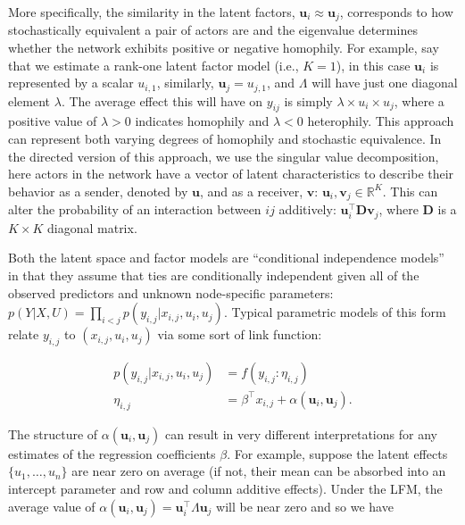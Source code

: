 \documentclass[12pt,pdflatex]{elsarticle}
\begin{document}
More specifically, the similarity in the latent factors, $\textbf{u}_{i} \approx \textbf{u}_{j}$, corresponds to how stochastically equivalent a pair of actors are and the eigenvalue determines whether the network exhibits positive or negative homophily. For example, say that we estimate a rank-one latent factor model (i.e., $K=1$), in this case $\textbf{u}_{i}$ is represented by a scalar $u_{i,1}$, similarly, $\textbf{u}_{j}=u_{j,1}$, and $\Lambda$ will have just one diagonal element $\lambda$. The average effect this will have on $y_{ij}$ is simply $\lambda \times u_{i} \times u_{j}$, where a positive value of $\lambda>0$ indicates homophily and $\lambda<0$ heterophily. This approach can represent both varying degrees of homophily and stochastic equivalence. In the directed version of this approach, we use the singular value decomposition, here actors in the network have a vector of latent characteristics to describe their behavior as a sender, denoted by $\textbf{u}$, and as a receiver, $\textbf{v}$: $\textbf{u}_{i}, \textbf{v}_{j} \in \mathbb{R}^{K}$. This can alter the probability of an interaction between $ij$ additively: $\textbf{u}_{i}^{\top} \textbf{D} \textbf{v}_{j}$, where $\textbf{D}$ is a $K \times K$ diagonal matrix.

Both the latent space and factor models are ``conditional independence models'' in that they assume that ties are conditionally independent given all of the observed predictors and unknown node-specific parameters: $p( Y | X , U ) = \prod_{i<j} p( y_{i,j}  | x_{i,j} , u_i , u_j)$. Typical parametric models of this form relate $y_{i,j}$ to $(x_{i,j},u_i,u_j)$ via some sort of link function:

\begin{align*}
	p(y_{i,j} | x_{i,j}, u_i , u_j ) & = f( y_{i,j} : \eta_{i,j} ) \\
	\eta_{i,j} &= \beta^\top x_{i,j} + \alpha(\textbf{u}_{i}, \textbf{u}_{j}).
\end{align*}

The structure of $\alpha(\textbf{u}_{i}, \textbf{u}_{j})$ can result in very different interpretations for any estimates of the regression coefficients $\beta$. For example, suppose the latent effects $\{ u_1,\ldots, u_n\}$ are near zero on average (if not, their mean can be absorbed into an intercept parameter and row and column additive effects). Under the LFM, the average value of $\alpha(\textbf{u}_{i}, \textbf{u}_{j}) = \textbf{u}_{i}^{\top} \Lambda \textbf{u}_{j}$ will be near zero and so we have
\end{document}
